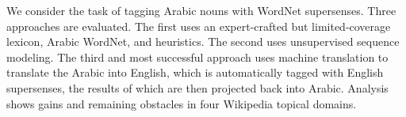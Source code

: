 We consider the task of tagging Arabic nouns with WordNet supersenses. Three approaches are evaluated. The first uses an expert-crafted but limited-coverage
 lexicon, Arabic WordNet, and heuristics. The second uses unsupervised sequence
 modeling. The third and most successful approach uses machine translation to
 translate the Arabic into English, which is automatically tagged with English
 supersenses, the results of which are then projected back into Arabic. Analysis
 shows gains and remaining obstacles in four Wikipedia topical domains.

